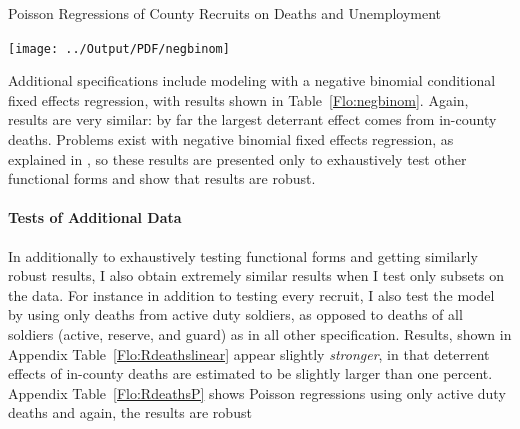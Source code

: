 \documentclass[12pt] {article}
\begin{document}
\pagebreak{}
\begin{table}
\caption{Poisson Regressions of County Recruits on Deaths and Unemployment}
\label{Flo:Poisson Basic}
\end{table}


\pagebreak{}
\clearpage{}
\begin{table}
\caption{}
\label{Flo:negbinom}
\texttt{[image: ../Output/PDF/negbinom]}
\end{table}

Additional specifications include modeling %
with a negative binomial conditional fixed effects regression, with results shown in Table~\ref{Flo:negbinom}. Again, results are very similar: by far the largest deterrant effect comes from in-county deaths. Problems exist with negative binomial fixed effects regression, as explained in \cite{negbinom}, so these results are presented only to exhaustively test other functional forms and show that results are robust. 

\paragraph{Tests of Additional Data}
In additionally to exhaustively testing functional forms and getting similarly robust results, I also obtain extremely similar results when I test only subsets on the data. For instance 
in addition to testing every recruit, I also test the model by using only deaths from active duty soldiers, as opposed to deaths of all soldiers (active, reserve, and guard) as in all other specification. Results, shown in Appendix Table~\ref{Flo:Rdeathslinear} appear slightly \textit{stronger}, in that deterrent effects of in-county deaths are estimated to be slightly larger than one percent. Appendix Table~\ref{Flo:RdeathsP} shows Poisson regressions using only active duty deaths and again, the results are robust

\end{document}

